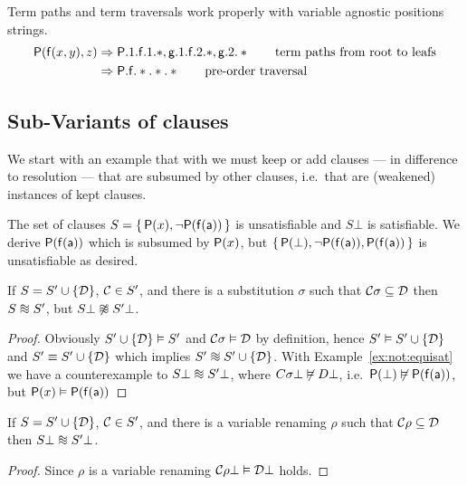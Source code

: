 \begin{example}
	Term paths and term traversals work properly with
	variable agnostic positions strings.
	\begin{align*}
		\mathsf{P}(\mathsf{f}(x,y),z)
		&\Rightarrow
		\mathsf{P}.1.\mathsf{f}.1.*, \mathsf{g}.1.\mathsf{f}.2.*, \mathsf{g}.2.*
		\tag*{term paths from root to leafs}
		\\
		&\Rightarrow \mathsf{P}.\mathsf{f}.*.*.*
		\tag*{pre-order traversal}
	\end{align*}
\end{example}

\subsection{Sub-Variants of clauses}

We start with an example that
with \InstGen{} we must keep or add clauses
--- in difference to resolution --- that are subsumed by other clauses,
i.e.\ that are (weakened) instances of kept clauses.

\begin{example}\label{ex:not:equisat}
	The set of clauses \( S = \{ \,
	\mathsf{P}(x), \lnot\mathsf{P}(\mathsf{f}(\mathsf{a}))
	\, \} \) is unsatisfiable and
	\( S\bot \) is satisfiable.
	We derive \( \mathsf{P}(\mathsf{f}(\mathsf{a})) \) which is subsumed by \( \mathsf{P}(x) \),
	but \( \{ \,
	\mathsf{P}(\bot), \lnot\mathsf{P}(\mathsf{f}(\mathsf{a})), \mathsf{P}(\mathsf{f}(\mathsf{a}))
	\, \} \) is unsatisfiable as desired.
\end{example}

\begin{lemma}
	If \( S = S' \cup \{ \mathcal{D} \} \),
	\( \mathcal{C} \in S' \), and there is a substitution \( \sigma \)
	such that \( \mathcal{C}\sigma \subseteq \mathcal{D} \)
	then
	\( S  \equisat S' \),
	but \( S\bot  \not\equisat S'\bot \).
\end{lemma}
\begin{proof}
	Obviously \( S'\cup \{ \mathcal{D} \} \vDash S' \) and
	\( \mathcal{C}\sigma\vDash\mathcal{D} \) by definition, hence
	\( S' \vDash S'\cup \{ \mathcal{D} \} \) and
	\( S' \equiv S'\cup \{ \mathcal{D} \} \) which implies
	\( S' \equisat S' \cup \{ \mcD \} \).
%
	With Example~\ref{ex:not:equisat} we have a counterexample to
	\( S\bot \equisat S'\bot \), where \( C\sigma\bot \not\vDash D\bot \),
	i.e.~\( \mathsf{P}(\bot)\not\vDash\mathsf{P}(\mathsf{f}(\mathsf{a})) \), but \( \mathsf{P}(x)\vDash\mathsf{P}(\mathsf{f}(\mathsf{a}))  \)
\end{proof}
\begin{lemma}
	If \( S = S' \cup \{ \mathcal{D} \} \),
	\( \mathcal{C} \in S' \), and there is a variable renaming \( \rho \)
	such that \( \mathcal{C}\rho \subseteq \mathcal{D} \)
	then
	\( S\bot\equisat S'\bot \).
\end{lemma}
\begin{proof}
	Since \( \rho \) is a variable renaming
	\( \mathcal{C}\rho\bot \vDash \mathcal{D}\bot \) holds.
\end{proof}

